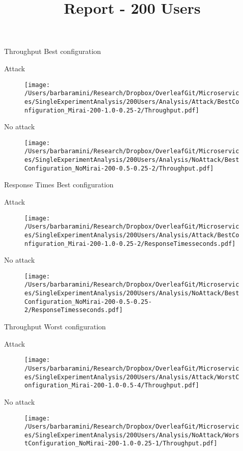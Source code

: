 \documentclass[10pt]{article}
\begin{document}
\title{Report - 200 Users}
\maketitle
Throughput Best configuration \par
Attack \par
\begin{figure}[h]
\texttt{[image: /Users/barbaramini/Research/Dropbox/OverleafGit/Microservices/SingleExperimentAnalysis/200Users/Analysis/Attack/BestConfiguration\_Mirai-200-1.0-0.25-2/Throughput.pdf]}
\end{figure}
No attack 
\begin{figure}[h]
\texttt{[image: /Users/barbaramini/Research/Dropbox/OverleafGit/Microservices/SingleExperimentAnalysis/200Users/Analysis/NoAttack/BestConfiguration\_NoMirai-200-0.5-0.25-2/Throughput.pdf]}
\end{figure}

\break
Response Times Best configuration \par
Attack\par
\begin{figure}[h]
\texttt{[image: /Users/barbaramini/Research/Dropbox/OverleafGit/Microservices/SingleExperimentAnalysis/200Users/Analysis/Attack/BestConfiguration\_Mirai-200-1.0-0.25-2/ResponseTimesseconds.pdf]}
\end{figure}
No attack
\begin{figure}[h]
\texttt{[image: /Users/barbaramini/Research/Dropbox/OverleafGit/Microservices/SingleExperimentAnalysis/200Users/Analysis/NoAttack/BestConfiguration\_NoMirai-200-0.5-0.25-2/ResponseTimesseconds.pdf]}
\end{figure}

\break
Throughput Worst configuration \par
Attack 

\begin{figure}[h]
\texttt{[image: /Users/barbaramini/Research/Dropbox/OverleafGit/Microservices/SingleExperimentAnalysis/200Users/Analysis/Attack/WorstConfiguration\_Mirai-200-1.0-0.5-4/Throughput.pdf]}
\end{figure}

No attack
\begin{figure}[h]
\texttt{[image: /Users/barbaramini/Research/Dropbox/OverleafGit/Microservices/SingleExperimentAnalysis/200Users/Analysis/NoAttack/WorstConfiguration\_NoMirai-200-1.0-0.25-1/Throughput.pdf]}
\end{figure}
\end{document}
